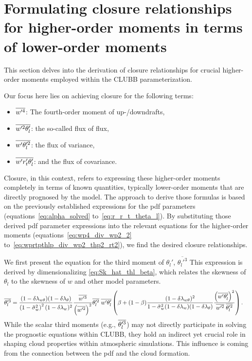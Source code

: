 \section{Formulating closure relationships for higher-order moments in terms of lower-order moments}
\label{sec:formulating-closure-relationships-for-higher-order-moments-in-terms-of-lower-order-moments}

This section delves into the derivation of closure relationships for crucial higher-order moments
employed within the \gls{CLUBB} parameterization.

Our focus here lies on achieving closure for the following terms:
\begin{itemize}
    \item $\overline{w'^4}$: The fourth-order moment of up-/downdrafts,
    \item $\overline{w'^2 \theta_l'}$: the so-called flux of flux,
    \item $\overline{w' \theta_l'^2}$: the flux of variance,
    \item $\overline{w' r_t' \theta_l'}$: and the flux of covariance.
\end{itemize}
Closure, in this context,
refers to expressing these higher-order moments completely in terms of known quantities,
typically lower-order moments that are directly prognosed by the model.
The approach to derive those formulas is based on
the previously established expressions for the \gls{pdf} parameters (equations~\eqref{eq:alpha_solved} to~\eqref{eq:r_r_t_theta_l}).
By substituting those derived \gls{pdf} parameter expressions
into the relevant equations for the higher-order moments (equations~\eqref{eq:wp4_div_wp2_2} to~\eqref{eq:wprtpthlp_div_wp2_thp2_rt2}),
we find the desired closure relationships.

We first present the equation for the third moment of $\theta_l'$, $\overline{\theta_l'^3}$
This expression is derived by dimensionalizing \cref{eq:Sk_hat_thl_beta},
which relates the skewness of $\theta_l$ to the skewness of $w$ and other model parameters.
\begin{align}
    \label{eq:thlp3_beta}
    \overline{\theta_l'^3}
    &= \frac{(1-\delta \lambda_{w \theta})(1-\delta \lambda_\theta)}{\left( 1 - \tilde{\sigma}_w^2 \right)^2 (1-\delta \lambda_w)^2}
    \frac{\overline{w'^3}}{\left( \overline{w'^2} \right)^2}
    \overline{\theta_l'^2} \;
    \overline{w'\theta_l'}
    \left(\beta + (1-\beta)
    \frac{(1-\delta \lambda_{w \theta})^2}{1-\tilde{\sigma}_w^2 (1-\delta \lambda_w)(1-\delta \lambda_\theta)}
    \frac{\left(\overline{w'\theta_l'}\right)^2}{\overline{w'^2} \; \overline{\theta_l'^2}}\right).
\end{align}
While the scalar third moments (e.g., $\overline{\theta_l'^3}$) may not directly participate
in solving the prognostic equations within \gls{CLUBB},
they hold an indirect yet crucial role in shaping cloud properties within atmospheric simulations.
This influence is coming from the connection between the \gls{pdf} and the cloud formation.

